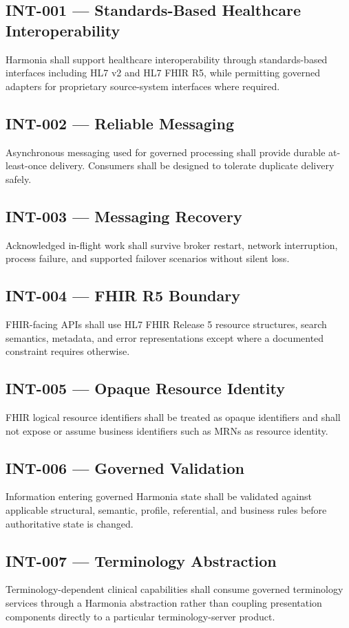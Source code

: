 \subsection{INT-001 --- Standards-Based Healthcare Interoperability}
Harmonia shall support healthcare interoperability through standards-based interfaces including HL7 v2 and HL7 FHIR R5, while permitting governed adapters for proprietary source-system interfaces where required.

\subsection{INT-002 --- Reliable Messaging}
Asynchronous messaging used for governed processing shall provide durable at-least-once delivery. Consumers shall be designed to tolerate duplicate delivery safely.

\subsection{INT-003 --- Messaging Recovery}
Acknowledged in-flight work shall survive broker restart, network interruption, process failure, and supported failover scenarios without silent loss.

\subsection{INT-004 --- FHIR R5 Boundary}
FHIR-facing APIs shall use HL7 FHIR Release 5 resource structures, search semantics, metadata, and error representations except where a documented constraint requires otherwise.

\subsection{INT-005 --- Opaque Resource Identity}
FHIR logical resource identifiers shall be treated as opaque identifiers and shall not expose or assume business identifiers such as MRNs as resource identity.

\subsection{INT-006 --- Governed Validation}
Information entering governed Harmonia state shall be validated against applicable structural, semantic, profile, referential, and business rules before authoritative state is changed.

\subsection{INT-007 --- Terminology Abstraction}
Terminology-dependent clinical capabilities shall consume governed terminology services through a Harmonia abstraction rather than coupling presentation components directly to a particular terminology-server product.

